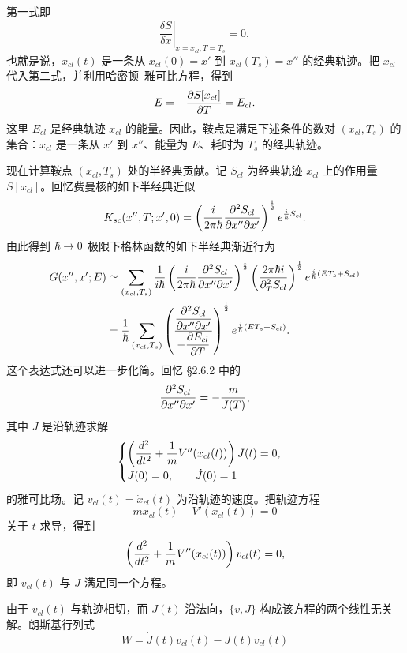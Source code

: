 第一式即
\[
\left.\frac{\delta S}{\delta x}\right|_{x=x_{cl},T=T_s}=0,
\]
也就是说，$x_{cl}(t)$ 是一条从 $x_{cl}(0)=x'$ 到 $x_{cl}(T_s)=x''$ 的经典轨迹。把 $x_{cl}$ 代入第二式，并利用哈密顿–雅可比方程，得到
\[
E=-\frac{\partial S[x_{cl}]}{\partial T}=E_{cl}.
\]
这里 $E_{cl}$ 是经典轨迹 $x_{cl}$ 的能量。因此，鞍点是满足下述条件的数对 $(x_{cl},T_s)$ 的集合：$x_{cl}$ 是一条从 $x'$ 到 $x''$、能量为 $E$、耗时为 $T_s$ 的经典轨迹。

现在计算鞍点 $(x_{cl},T_s)$ 处的半经典贡献。记 $S_{cl}$ 为经典轨迹 $x_{cl}$ 上的作用量 $S[x_{cl}]$。回忆费曼核的如下半经典近似
\[
K_{sc}(x'',T;x',0)=
\left(\frac{i}{2\pi\hbar}\frac{\partial^2 S_{cl}}{\partial x''\partial x'}\right)^{\frac12}
e^{\frac{i}{\hbar}S_{cl}}.
\]
由此得到 $\hbar\to0$ 极限下格林函数的如下半经典渐近行为
\[
\begin{aligned}
G(x'',x';E)
&\simeq\sum_{(x_{cl},T_s)}\frac1{i\hbar}
\left(\frac{i}{2\pi\hbar}\frac{\partial^2 S_{cl}}{\partial x''\partial x'}\right)^{\frac12}
\left(\frac{2\pi\hbar i}{\partial_T^2 S_{cl}}\right)^{\frac12}
e^{\frac{i}{\hbar}(ET_s+S_{cl})}\\
&=\frac1{\hbar}\sum_{(x_{cl},T_s)}
\left(\frac{\dfrac{\partial^2 S_{cl}}{\partial x''\partial x'}}
{-\dfrac{\partial E_{cl}}{\partial T}}\right)^{\frac12}
e^{\frac{i}{\hbar}(ET_s+S_{cl})}.
\end{aligned}
\]
这个表达式还可以进一步化简。回忆 §2.6.2 中的
\[
\frac{\partial^2 S_{cl}}{\partial x''\partial x'}=-\frac{m}{J(T)},
\]
其中 $J$ 是沿轨迹求解
\[
\begin{cases}
\left(\dfrac{d^2}{d t^2}+\dfrac1m V''(x_{cl}(t))\right)J(t)=0,\\[2mm]
J(0)=0,\qquad \dot J(0)=1
\end{cases}
\]
的雅可比场。记 $v_{cl}(t)=\dot x_{cl}(t)$ 为沿轨迹的速度。把轨迹方程
\[
m\ddot x_{cl}(t)+V'(x_{cl}(t))=0
\]
关于 $t$ 求导，得到
\[
\left(\frac{d^2}{d t^2}+\frac1m V''(x_{cl}(t))\right)v_{cl}(t)=0,
\]
即 $v_{cl}(t)$ 与 $J$ 满足同一个方程。

由于 $v_{cl}(t)$ 与轨迹相切，而 $J(t)$ 沿法向，$\{v,J\}$ 构成该方程的两个线性无关解。朗斯基行列式
\[
W=\dot J(t)v_{cl}(t)-J(t)\dot v_{cl}(t)
\]

